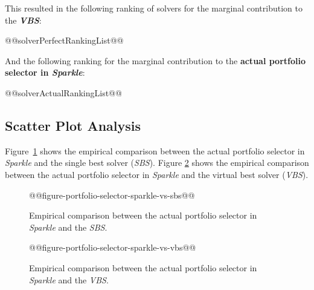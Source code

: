 \documentclass[british]{article}
\newif\iftest
\begin{document}
This resulted in the following ranking of solvers for the marginal contribution to the \textbf{{\em VBS}}:

\begin{enumerate}
@@solverPerfectRankingList@@
\end{enumerate}

And the following ranking for the marginal contribution to the \textbf{actual portfolio selector in \emph{Sparkle}}:

\begin{enumerate} 
@@solverActualRankingList@@
\end{enumerate}


\subsection{Scatter Plot Analysis}

Figure~\ref{fig:sparkle_vs_sbs} shows the empirical comparison between the actual portfolio selector in \emph{Sparkle} and the single best solver (\emph{SBS}).
Figure \ref{fig:sparkle_vs_vbs} shows the empirical comparison between the actual portfolio selector in \emph{Sparkle} and the virtual best solver (\emph{VBS}).

\begin{figure}[htbp]
\noindent \begin{centering}
@@figure-portfolio-selector-sparkle-vs-sbs@@
\par\end{centering}

\caption{Empirical comparison between the actual portfolio selector in \emph{Sparkle} and the \emph{SBS}.}\label{fig:sparkle_vs_sbs}
\end{figure}

\begin{figure}[htbp]
\noindent \begin{centering}
@@figure-portfolio-selector-sparkle-vs-vbs@@
\par\end{centering}

\caption{Empirical comparison between the actual portfolio selector in \emph{Sparkle} and the \emph{VBS}.}\label{fig:sparkle_vs_vbs}
\end{figure}


\iftest
\section{Experimental Results on the Test Set}
\label{sec:Experimental_Results_Test}

In this section, the @@metric@@ results for the current portfolio selector in \emph{Sparkle} on solving the test instance set @@testInstanceClass@@ is reported.

\begin{itemize}
\item \textbf{Actual Portfolio Selector in \emph{Sparkle}}, @@metric@@: @@testActualPAR@@
\end{itemize}
\fi




\end{document}
